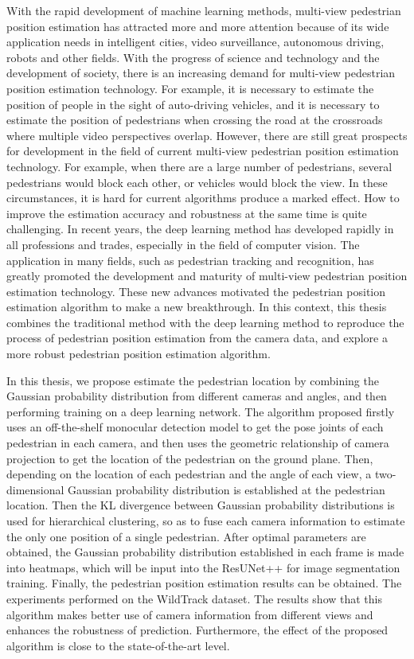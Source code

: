 \begin{abstract*}
  With the rapid development of machine learning methods, multi-view pedestrian position estimation has attracted more and more attention because of its wide application needs in intelligent cities, video surveillance, autonomous driving, robots and other fields. With the progress of science and technology and the development of society, there is an increasing demand for multi-view pedestrian position estimation technology. For example, it is necessary to estimate the position of people in the sight of auto-driving vehicles, and it is necessary to estimate the position of pedestrians when crossing the road at the crossroads where multiple video perspectives overlap. However, there are still great prospects for development in the field of current multi-view pedestrian position estimation technology. For example, when there are a large number of pedestrians, several pedestrians would block each other, or vehicles would block the view. In these circumstances, it is hard for current algorithms produce a marked effect. How to improve the estimation accuracy and robustness at the same time is quite challenging. In recent years, the deep learning method has developed rapidly in all professions and trades, especially in the field of computer vision. The application in many fields, such as pedestrian tracking and recognition, has greatly promoted the development and maturity of multi-view pedestrian position estimation technology. These new advances motivated the pedestrian position estimation algorithm to make a new breakthrough. In this context, this thesis combines the traditional method with the deep learning method to reproduce the process of pedestrian position estimation from the camera data, and explore a more robust pedestrian position estimation algorithm.
  
  In this thesis, we propose estimate the pedestrian location by combining the Gaussian probability distribution from different cameras and angles, and then performing training on a deep learning network. The algorithm proposed firstly uses an off-the-shelf monocular detection model to get the pose joints of each pedestrian in each camera, and then uses the geometric relationship of camera projection to get the location of the pedestrian on the ground plane. Then, depending on the location of each pedestrian and the angle of each view, a two-dimensional Gaussian probability distribution is established at the pedestrian location. Then the KL divergence between Gaussian probability distributions is used for hierarchical clustering, so as to fuse each camera information to estimate the only one position of a single pedestrian. After optimal parameters are obtained, the Gaussian probability distribution established in each frame is made into heatmaps, which will be input into the ResUNet++ for image segmentation training. Finally, the pedestrian position estimation results can be obtained. The experiments performed on the WildTrack dataset. The results show that this algorithm makes better use of camera information from different views and enhances the robustness of prediction. Furthermore, the effect of the proposed algorithm is close to the state-of-the-art level.

\end{abstract*}
